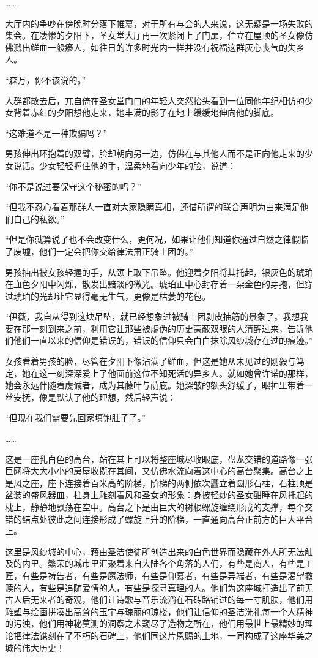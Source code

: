 ……

大厅内的争吵在傍晚时分落下帷幕，对于所有与会的人来说，这无疑是一场失败的集会。在凄惨的夕阳下，圣女堂大厅再一次紧闭上了门扉，伫立在屋顶的圣女像仿佛溅出鲜血一般瘆人，如往日的许多时光内一样并没有祝福这群灰心丧气的失乡人。

“森万，你不该说的。”

人群都散去后，兀自倚在圣女堂门口的年轻人突然抬头看到一位同他年纪相仿的少女背着赤红的夕阳想他走来，她丰满的影子在地上缓缓地伸向他的脚底。

“这难道不是一种欺骗吗？”

男孩伸出环抱着的双臂，脸却朝向另一边，仿佛在与其他人而不是正向他走来的少女说话。少女轻轻握住他的手，温柔地看向少年的脸，说道：

“你不是说过要保守这个秘密的吗？”

“但我不忍心看着那群人一直对大家隐瞒真相，还借所谓的联合声明为由来满足他们自己的私欲。”

“但是你就算说了也不会改变什么，更何况，如果让他们知道你通过自然之律假临了废墟，他们一定会把你交给律法肃正骑士团的。”

男孩抽出被女孩轻握的手，从颈上取下吊坠。他迎着夕阳将其托起，银灰色的琥珀在血色夕阳中闪烁，散发出黯淡的微光。琥珀正中心封存着一朵金色的芽孢，但穿过琥珀的光却让它显得毫无生气，更像是枯萎的花苞。

“伊薇，我自从得到这块吊坠，就已经想象过被骑士团剥皮抽筋的景象了。我想我要在那一刻到来之前，利用它让那些被虚伪的历史蒙蔽双眼的人清醒过来，告诉他们他们一直以来的信仰是错误的，错误的信仰只会白白抹除风纱城存在过的痕迹。”

女孩看着男孩的脸，尽管在夕阳下像沾满了鲜血，但这是她从未见过的刚毅与笃定，她在这一刻深深爱上了他面前这位不知死活的异乡人。就如她曾许诺的那样，她会永远伴随着虔诚者，成为其藤叶与荫庇。她深皱的额头舒缓了，眼神里带着一丝安抚，像是默认了他的理想，然后轻声说：

“但现在我们需要先回家填饱肚子了。”

……

这是一座乳白色的高台，站在其上可以将整座城尽收眼底，盘龙交错的道路像一张巨网将大大小小的房屋收揽在其间，又仿佛水流向着这中心的高台聚集。高台之上是风之座，座下连接着百米高的阶梯，阶梯的两侧依次矗立着圆形石柱，石柱顶是盆装的盛风器皿，柱身上雕刻着风和圣女的形象：身披轻纱的圣女酣睡在风托起的枕上，静静地飘荡在空中。高台之下是由巨大的树根螺旋缠绕形成的支撑，每个交错的结点处彼此之间连接形成了螺旋上升的阶梯，一直通向高台正前方的巨大平台上。

这里是风纱城的中心，藉由圣洁使徒所创造出来的白色世界而隐藏在外人所无法触及的内里。繁荣的城市里汇聚着来自大陆各个角落的人们，有些是商人，有些是工匠，有些是祷告者，有些是魔法师，有些是仰慕者，有些是异端者，有些是渴望救赎的人，有些是追随爱情的人，有些是探寻真理的人。他们为这座城打造出了前无古人后无来者的奇观，他们让诗歌与音乐流淌在石砖路铺过的每一寸肌肤，他们用雕塑与绘画拼凑出高耸的玉宇与瑰丽的琼楼，他们让信仰的圣洁洗礼每一个人精神的污浊，他们用神秘莫测的洞察之术窥尽了造物之所在，他们用最世上最精妙的理论把律法镌刻在了不朽的石碑上，他们同这片恩赐的土地，一同构成了这座华美之城的伟大历史！

